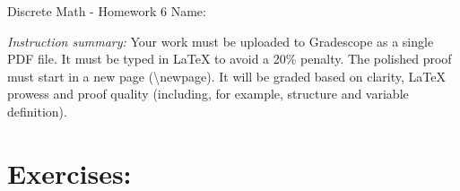 \documentclass[11pt]{article}
\begin{document}
\begin{center}
	{\LARGE Discrete Math - Homework 6} \Large \newline
    Name:
\end{center}

\noindent \emph{Instruction summary:} Your work must be uploaded to Gradescope as a single PDF file. It must be typed in LaTeX to avoid a 20\% penalty. The polished proof must start in a new page (\textbackslash{newpage}). It will be graded based on clarity, LaTeX prowess and proof quality (including, for example, structure and variable definition).

\section*{Exercises:}
\end{document}

